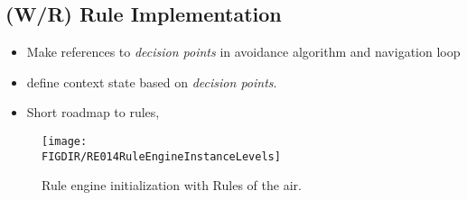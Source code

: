 \subsection{(W/R) Rule Implementation}\label{sec:ruleImplementation}
\begin{itemize}
    \item Make references to \emph{decision points} in avoidance algorithm and navigation loop
    \item define context state based on \emph{decision points}.
    \item Short roadmap to rules,
\end{itemize}
\begin{figure}[H]
    \centering
    \texttt{[image: \\FIGDIR/RE014RuleEngineInstanceLevels]} 
    \caption{Rule engine initialization with Rules of the air.}
    \label{fig:RuleEngineInstanceLevels}
\end{figure}